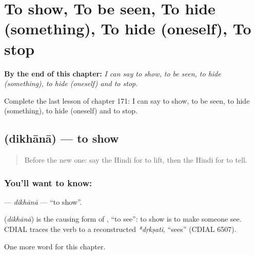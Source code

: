 
\chapter{To show, To be seen, To hide (something), To hide (oneself), To stop}
\label{ch:hi-to-show-to-be-seen-to-hide-something-to-hide-oneself-to-stop}

\begin{chapteropening}
\textbf{By the end of this chapter:} \emph{I can say to show, to be seen, to hide (something), to hide (oneself) and to stop.}

Complete the last lesson of chapter 171: I can say to show, to be seen, to hide (something), to hide (oneself) and to stop.
\end{chapteropening}

\section[\texorpdfstring{\hi{दिखाना} (dikhānā)}{दिखाना (dikhānā)}]{ (dikhānā) — to show}

\label{lesson:HI-C171-dikhana}



\begin{quote}
Before the new one: say the Hindi for to lift, then the Hindi for to tell.
\end{quote}

\subsection*{You'll want to know: }
\textbf{} — \emph{dikhānā} — \textquotedblleft{}to show\textquotedblright{}.

\begin{cousinweb}
\textbf{} (\emph{dikhānā}) is the causing form of \textbf{}, \textquotedblleft{}to see\textquotedblright{}: to show is to make someone see. CDIAL traces the verb to a reconstructed \emph{*dṛkṣati}, \textquotedblleft{}sees\textquotedblright{} (CDIAL 6507).
\end{cousinweb}

\begin{grammarlens}[title={What you've built}]
One more word for this chapter.
\end{grammarlens}


